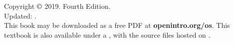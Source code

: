 \chapter*{}
\vfill

\noindent%
Copyright $\copyright$ 2019. Fourth Edition. \\
Updated: \versiondate. \\

\noindent%
This book may be downloaded as a free PDF at
    {\color{black}\textbf{openintro.org/os}}.
This textbook is also available under a
,
with the source files hosted on
. \\

\printlocation


